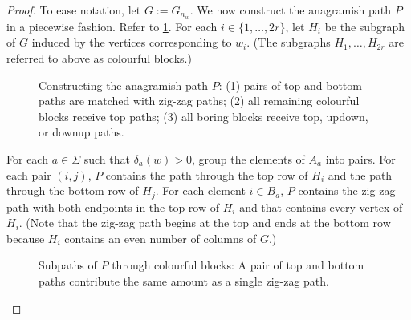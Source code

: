 \documentclass{patmorin}
\begin{document}
\begin{proof}
    To ease notation, let $G:=G_{n_w}$.  We now construct the anagramish path $P$ in a piecewise fashion.  Refer to \cref{path_construction}.  For each $i\in\{1,\ldots,2r\}$, let $H_i$ be the subgraph of $G$ induced by the vertices corresponding to $w_i$. (The subgraphs $H_1,\ldots,H_{2r}$ are referred to above as colourful blocks.)
    \begin{figure}
        \caption{Constructing the anagramish path $P$:
            (1) pairs of top and bottom paths are matched with zig-zag paths;
            (2) all remaining colourful blocks receive top paths;
            (3) all boring blocks receive top, updown, or downup paths.
        }
        \label{path_construction}
    \end{figure}
    \begin{compactenum}
        \item For each $a\in\Sigma$ such that $\delta_a(w)>0$, group the elements of $A_a$ into pairs.  For each pair $(i,j)$, $P$ contains the path through the top row of $H_i$ and the path through the bottom row of $H_j$.  For each element $i\in B_a$, $P$ contains the zig-zag path with both endpoints in the top row of $H_i$ and that contains every vertex of $H_i$.  (Note that the zig-zag path begins at the top and ends at the bottom row because $H_i$ contains an even number of columns of $G$.)

        \begin{figure}
            \caption{Subpaths of $P$ through colourful blocks: A pair of top and bottom paths contribute the same amount as a single zig-zag path.}
            \label{paths}
        \end{figure}



\end{compactenum}
\end{proof}
\end{document}

